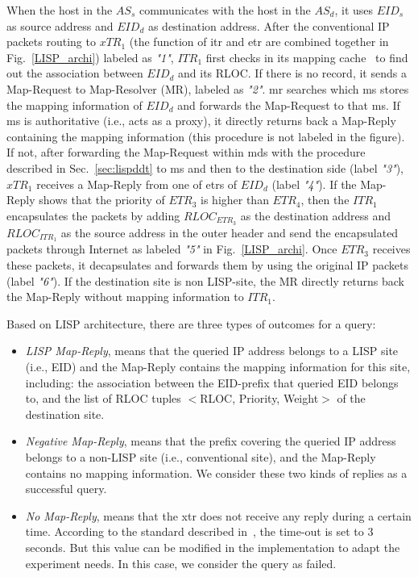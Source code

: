 When the host in the $AS_s$ communicates with the host in the $AS_d$, it uses $EID_s$ as source address and $EID_d$ as destination address. After the conventional IP packets routing to $xTR_1$ (the function of \acrshort{itr} and \acrshort{etr} are combined together in Fig.~\ref{LISP_archi}) labeled as \emph{"1"}, $ITR_1$ first checks in its mapping cache~\cite{lispCacheCost} to find out the association between $EID_d$ and its RLOC. If there is no record, it sends a Map-Request to Map-Resolver (MR), labeled as \emph{"2"}. \acrshort{mr} searches which \acrfull{ms} stores the mapping information of $EID_d$ and forwards the Map-Request to that \acrshort{ms}. If \acrshort{ms} is authoritative (i.e., acts as a proxy), it directly returns back a Map-Reply containing the mapping information (this procedure is not labeled in the figure). If not, after forwarding the Map-Request within \acrshort{mds} with the procedure described in Sec.~\ref{sec:lispddt} to \acrshort{ms} and then to the destination side (label \emph{"3"}), $xTR_1$ receives a Map-Reply from one of \acrshort{etr}s of $EID_d$ (label \emph{"4"}). If the Map-Reply shows that the priority of $ETR_3$ is higher than $ETR_4$, then the $ITR_1$ encapsulates the packets by adding $RLOC_{ETR_3}$ as the destination address and $RLOC_{ITR_1}$ as the source address in the outer header and send the encapsulated packets through Internet as labeled \emph{"5"} in Fig.~\ref{LISP_archi}. Once $ETR_3$ receives these packets, it decapsulates and forwards them by using the original IP packets (label \emph{"6"}). If the destination site is non LISP-site, the MR directly returns back the Map-Reply without mapping information to $ITR_1$.

Based on LISP architecture, there are three types of outcomes for a query:
\begin{itemize}[noitemsep,topsep=0pt]
	\item \emph{LISP Map-Reply}, means that the queried IP address belongs to a LISP site (i.e., EID) and the Map-Reply contains the mapping information for this site, including: the association between the EID-prefix that queried EID belongs to, and the list of RLOC tuples $<$RLOC, Priority, Weight$>$ of the destination site.
	\item \emph{Negative Map-Reply}, means that the prefix covering the queried IP address belongs to a non-LISP site (i.e., conventional site), and the Map-Reply contains no mapping information. We consider these two kinds of replies as a successful query.
    \item \emph{No Map-Reply}, means that the \acrshort{xtr} does not receive any reply during a certain time. According to the standard described in~\cite{rfc6830}, the time-out is set to 3 seconds. But this value can be modified in the implementation to adapt the experiment needs. In this case, we consider the query as failed.
\end{itemize}


